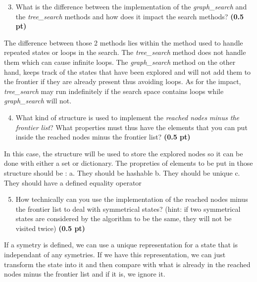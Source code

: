 \documentclass[11pt,a4paper]{../template/report}
\begin{document}
\begin{enumerate}
\setcounter{enumi}{2}
    \item What is the difference between the implementation of the \textit{graph\_search} and the \textit{tree\_search} methods and how does it impact the search methods? \textbf{(0.5 pt)}
\end{enumerate}

\begin{answer}
The difference between those 2 methods lies within the method used to handle repeated states or loops in the search.
The \textit{tree\_search} method does not handle them which can cause infinite loops.
The \textit{graph\_search} method on the other hand, keeps track of the states that have been explored and will not add them to the frontier 
if they are already present thus avoiding loops.
As for the impact, \textit{tree\_search} may run indefinitely if the search space contains loops while \textit{graph\_search} will not.
\end{answer}



\begin{enumerate}
\setcounter{enumi}{3}
    \item What kind of structure is used to implement the \textit{reached nodes minus the frontier list}? What properties must thus have the elements that you can
	put inside the reached nodes minus the frontier list? \textbf{(0.5 pt)}
\end{enumerate}

\begin{answer}
In this case, the structure will be used to store the explored nodes so it can be done with either a set or dictionary.
The propreties of elements to be put in those structure should be : 
 a. They should be hashable
 b. They should be unique 
 c. They should have a defined equality operator 
\end{answer}



\begin{enumerate}
\setcounter{enumi}{4}
    \item How technically can you use the implementation of the reached nodes minus the frontier list to deal with symmetrical states? (hint: if two symmetrical states are considered by the algorithm to be the same, they will not be visited twice) \textbf{(0.5 pt)}
\end{enumerate}

\begin{answer}
If a symetry is defined, we can use a unique representation for a state that is independant of any symetries. If we have this
representation, we can just transform the state into it and then compare with what is already in the reached nodes minus the frontier list and if it is, we ignore it.
\end{answer}
\end{document}
